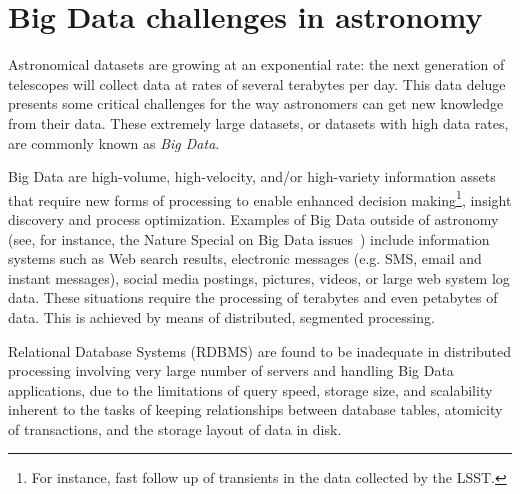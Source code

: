 \chapter{Big Data challenges in astronomy} %
\label{theproblem}

Astronomical datasets are growing at an exponential rate: the next generation of telescopes will collect data at rates of
several terabytes %
per day. This data
deluge %
presents some critical challenges for the way astronomers
can
get new knowledge from their data.
These extremely large datasets, or datasets with high data rates, are commonly known as
\emph{Big Data}.

Big Data are high-volume, high-velocity, and/or high-variety information assets that require new forms of processing to enable enhanced
decision making\footnote{For instance, fast follow up of transients in the data collected by the LSST.}, %
insight discovery and process optimization. Examples of Big Data
outside of astronomy (see, for instance, the Nature Special on Big Data issues~\cite{Nat_01})
include information
systems
such as Web search results, electronic messages (e.g. SMS, email and instant messages), social media postings, pictures, videos, 
or large web %
system log data.
These situations require the %
processing of terabytes and even petabytes of data. This is achieved by
means of
distributed, segmented
processing.

Relational Database Systems (RDBMS)
are found to be inadequate in distributed processing involving very large number of servers and handling Big Data applications, due to the limitations of query speed, storage size, and scalability inherent to the tasks of keeping relationships between database tables, atomicity of transactions, and the storage layout of data in disk.


